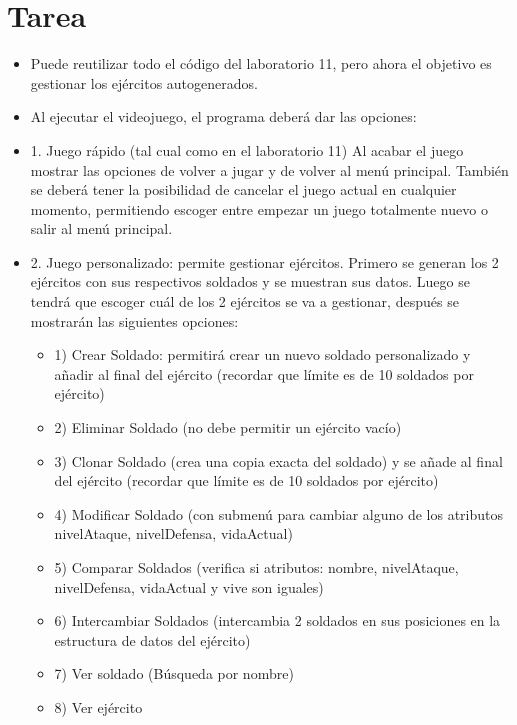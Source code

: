 \documentclass{article}
\begin{document}

	\section{Tarea}
	\begin{itemize}		
        \item Puede reutilizar todo el código del laboratorio 11, pero ahora el objetivo es gestionar los ejércitos autogenerados.
        \item Al ejecutar el videojuego, el programa deberá dar las opciones:
        \item 1. Juego rápido (tal cual como en el laboratorio 11)
        Al acabar el juego mostrar las opciones de volver a jugar y de volver al menú principal. También se deberá tener la posibilidad de cancelar el juego actual en cualquier momento, permitiendo escoger entre empezar un juego totalmente nuevo o salir al menú principal.
        \item 2. Juego personalizado: permite gestionar ejércitos. Primero se generan los 2 ejércitos con sus respectivos soldados y se muestran sus datos.
        Luego se tendrá que escoger cuál de los 2 ejércitos se va a gestionar, después se mostrarán las siguientes opciones:
        \begin{itemize}
            \item 1) Crear Soldado: permitirá crear un nuevo soldado personalizado y añadir al final del ejército (recordar que límite es de 10 soldados por ejército)
            \item 2) Eliminar Soldado (no debe permitir un ejército vacío)
            \item 3) Clonar Soldado (crea una copia exacta del soldado) y se añade al final del ejército (recordar que límite es de 10 soldados por ejército)
            \item 4) Modificar Soldado (con submenú para cambiar alguno de los atributos nivelAtaque, nivelDefensa, vidaActual)
            \item 5) Comparar Soldados (verifica si atributos: nombre, nivelAtaque, nivelDefensa, vidaActual y vive son iguales)
            \item 6) Intercambiar Soldados (intercambia 2 soldados en sus posiciones en la estructura de datos del ejército)
            \item 7) Ver soldado (Búsqueda por nombre)
            \item 8) Ver ejército

\end{itemize}
\end{itemize}
\end{document}
